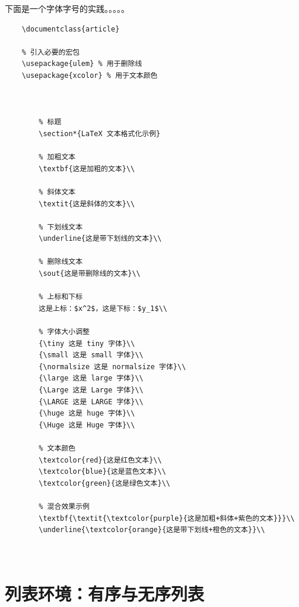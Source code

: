 下面是一个字体字号的实践。。。。。
\begin{lstlisting}
	\documentclass{article}
	
	% 引入必要的宏包
	\usepackage{ulem} % 用于删除线
	\usepackage{xcolor} % 用于文本颜色
	
	
		
		% 标题
		\section*{LaTeX 文本格式化示例}
		
		% 加粗文本
		\textbf{这是加粗的文本}\\
		
		% 斜体文本
		\textit{这是斜体的文本}\\
		
		% 下划线文本
		\underline{这是带下划线的文本}\\
		
		% 删除线文本
		\sout{这是带删除线的文本}\\
		
		% 上标和下标
		这是上标：$x^2$，这是下标：$y_1$\\
		
		% 字体大小调整
		{\tiny 这是 tiny 字体}\\
		{\small 这是 small 字体}\\
		{\normalsize 这是 normalsize 字体}\\
		{\large 这是 large 字体}\\
		{\Large 这是 Large 字体}\\
		{\LARGE 这是 LARGE 字体}\\
		{\huge 这是 huge 字体}\\
		{\Huge 这是 Huge 字体}\\
		
		% 文本颜色
		\textcolor{red}{这是红色文本}\\
		\textcolor{blue}{这是蓝色文本}\\
		\textcolor{green}{这是绿色文本}\\
		
		% 混合效果示例
		\textbf{\textit{\textcolor{purple}{这是加粗+斜体+紫色的文本}}}\\
		\underline{\textcolor{orange}{这是带下划线+橙色的文本}}\\
		
	
\end{lstlisting}

\section{列表环境：有序与无序列表}



